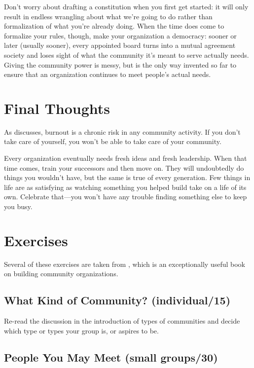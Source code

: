 Don't worry about drafting a constitution when you first get started: it
will only result in endless wrangling about what we're going to do
rather than formalization of what you're already doing. When the time
does come to formalize your rules, though, make your organization a
democracy: sooner or later (usually sooner), every appointed board turns
into a mutual agreement society and loses sight of what the community
it's meant to serve actually needs. Giving the community power is
messy, but is the only way invented so far to ensure that an
organization continues to meet people's actual needs.

\section{Final Thoughts}\label{s:community-final}

As \cite{Pign2016} discusses, burnout is a chronic risk in any
community activity. If you don't take care of yourself, you won't be
able to take care of your community.

Every organization eventually needs fresh ideas and fresh leadership.
When that time comes, train your successors and then move on. They will
undoubtedly do things you wouldn't have, but the same is true of every
generation. Few things in life are as satisfying as watching something
you helped build take on a life of its own. Celebrate that---you won't
have any trouble finding something else to keep you busy.

\section{Exercises}\label{s:community-exercises}

Several of these exercises are taken from \cite{Brow2007}, which is
an exceptionally useful book on building community organizations.

\subsection*{What Kind of Community? (individual/15)}

Re-read the discussion in the introduction of types of communities and
decide which type or types your group is, or aspires to be.

\subsection*{People You May Meet (small groups/30)}

